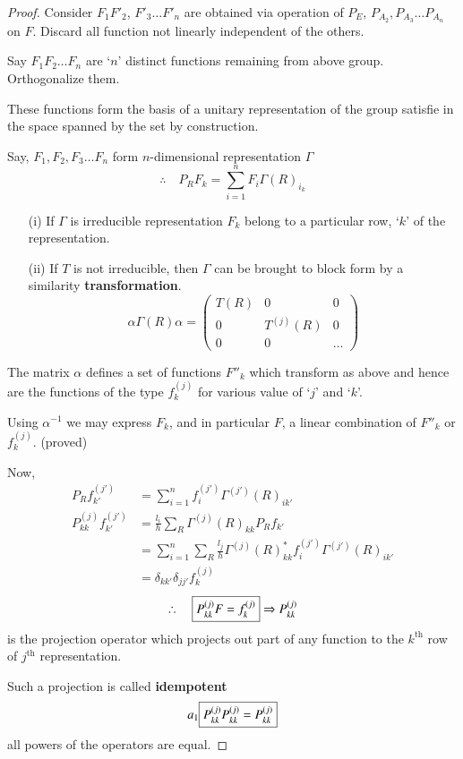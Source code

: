 \begin{proof}
Consider $F_{1}F'_{2}$, $F'_{3}\ldots F'_{n}$ are obtained via operation of $P_{E}$, $P_{A_{2}},P_{A_{3}}\ldots P_{A_{n}}$ on $F$. Discard all function not linearly independent of the others.

Say $F_{1}F_{2}\ldots F_{n}$ are `$n$' distinct functions remaining from above group. Orthogonalize them.

These functions form the basis of a unitary representation of the group  satisfie in the space spanned by the set by construction.

Say, $F_{1},F_{2},F_{3}\ldots F_{n}$ form $n$-dimensional representation $\Gamma$
$$
\therefore\quad P_{R}F_{k}=\sum\limits^{n}_{i=1}F_{i}\Gamma(R)_{i_{k}}
$$
\begin{itemize}
\item[(i)] If $\Gamma$ is irreducible representation $F_{k}$ belong to a particular row, `$k$' of the representation.

\item[(ii)] If $T$ is not irreducible, then $\Gamma$ can be brought to block form by a similarity {\bf transformation}.
\begin{equation*}
\alpha\Gamma(R)\alpha =
\left(
\begin{matrix}
T(R) & 0 & 0\\
0 & T^{(j)}(R) & 0\\
0 & 0 & \ldots
\end{matrix}
\right)\tag{A}\label{lec9-eqA}
\end{equation*}
\end{itemize}

The matrix $\alpha$ defines a set of functions $F''_{k}$ which transform as above and hence are the functions of the type $f^{(j)}_{k}$ for various value of `$j$' and `$k$'.

Using $\alpha^{-1}$ we may express $F_{k}$, and in particular $F$, a linear combination of $F''_{k}$ or $f^{(j)}_{k}$. (proved)

Now,
\begin{align*}
P_{R}f^{(j')}_{k'} &= \sum\limits^{n}_{i=1}f_{i}^{(j')}\Gamma^{(j')}(R)_{ik'}\\
P^{(j)}_{kk}f^{(j')}_{k'} &= \frac{l_{i}}{h}\sum\limits_{R}\Gamma^{(j)}(R)_{kk}P_{R}f_{k'}\\
&= \sum\limits^{n}_{i=1}\sum\limits_{R}\frac{l_{j}}{h}\Gamma^{(j)}(R)^{*}_{kk}f^{(j')}_{i}\Gamma^{(j')}(R)_{ik'}\\
&= \delta_{kk'}\delta_{jj'}f^{(j)}_{k}
\end{align*}
$$
\therefore\quad \fbox{$P^{(j)}_{kk}F=f^{(j)}_{k}$}\Rightarrow P^{(j)}_{kk}
$$
is the projection operator which projects out part of any function to the $k^{\text{th}}$ row of $j^{\text{th}}$ representation.

Such a projection is called {\bf idempotent}
$$
a_{1}\fbox{$P^{(j)}_{kk}P^{(j)}_{kk}=P^{(j)}_{kk}$}
$$
all powers of the operators are equal.
\end{proof}

